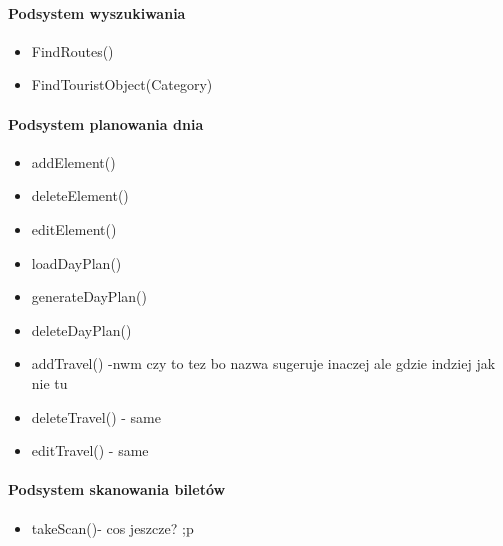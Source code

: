 \documentclass[10pt,twoside,a4paper]{report}
\begin{document}
\paragraph{Podsystem wyszukiwania}
\begin{itemize}
\item FindRoutes()
\item FindTouristObject(Category)
\end{itemize}

\paragraph{Podsystem planowania dnia}
\begin{itemize}
\item addElement()
\item deleteElement()
\item editElement()
\item loadDayPlan()
\item generateDayPlan()
\item deleteDayPlan()
\item addTravel() -nwm czy to tez bo nazwa sugeruje inaczej ale gdzie indziej jak nie tu
\item deleteTravel() - same
\item editTravel() - same
\end{itemize}

\paragraph{Podsystem skanowania biletów}
\begin{itemize}
\item takeScan()- cos jeszcze? ;p 
\end{itemize}
\end{document}
